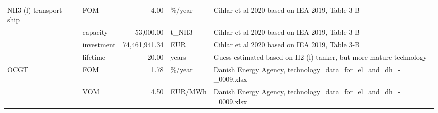 \begin{longtable}{p{5cm}p{3cm}rp{3cm}p{11cm}}
NH3 (l) transport ship & FOM &           4.00 &                            \%/year &                                                                                                                                                                                                                                                                                       Cihlar et al 2020 based on IEA 2019, Table 3-B \\
                      & capacity &      53,000.00 &                             t\_NH3 &                                                                                                                                                                                                                                                                                       Cihlar et al 2020 based on IEA 2019, Table 3-B \\
                      & investment &  74,461,941.34 &                               EUR &                                                                                                                                                                                                                                                                                       Cihlar et al 2020 based on IEA 2019, Table 3-B \\
                      & lifetime &          20.00 &                             years &                                                                                                                                                                                                                                                                   Guess estimated based on H2 (l) tanker, but more mature technology \\
OCGT & FOM &           1.78 &                            \%/year &                                                                                                                                                                                                                                                                      Danish Energy Agency, technology\_data\_for\_el\_and\_dh\_-\_0009.xlsx \\
                      & VOM &           4.50 &                           EUR/MWh &                                                                                                                                                                                                                                                                      Danish Energy Agency, technology\_data\_for\_el\_and\_dh\_-\_0009.xlsx \\

\end{longtable}

